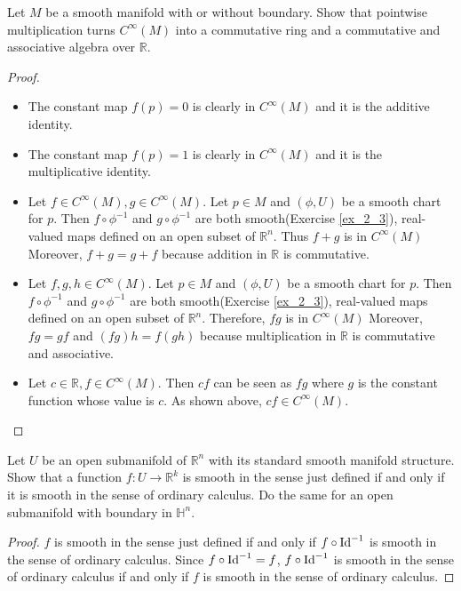 \begin{customexer}{2.1}
  Let $M$ be a smooth manifold with or without boundary.
  Show that pointwise multiplication turns $C^{\infty}(M)$ into a commutative ring and a commutative and associative algebra over $\mathbb{R}$.
\end{customexer}

\begin{proof}
  $ $
  \begin{itemize}
    \item
      The constant map $f(p) = 0$ is clearly in $C^{\infty}(M)$ and it is the additive identity.
    \item
      The constant map $f(p) = 1$ is clearly in $C^{\infty}(M)$ and it is the multiplicative identity.
    \item
      Let $f \in C^{\infty}(M), g \in C^{\infty}(M)$.
      Let $p \in M$ and $(\phi, U)$ be a smooth chart for $p$.
      Then $f \circ \phi^{-1}$ and $g \circ \phi^{-1}$ are both smooth(Exercise \ref{ex_2_3}), real-valued maps defined on an open subset of $\mathbb{R}^n$.
      Thus $f + g$ is in $C^{\infty}(M)$ 
      Moreover, $f + g = g + f$ because addition in $\mathbb{R}$ is commutative.
    \item
      Let $f, g, h \in C^{\infty}(M)$.
      Let $p \in M$ and $(\phi, U)$ be a smooth chart for $p$.
      Then $f \circ \phi^{-1}$ and $g \circ \phi^{-1}$ are both smooth(Exercise \ref{ex_2_3}), real-valued maps defined on an open subset of $\mathbb{R}^n$.
      Therefore, $fg$ is in $C^{\infty}(M)$
      Moreover, $fg = gf$ and $(fg)h = f(gh)$ because multiplication in $\mathbb{R}$ is commutative and associative.
    \item
      Let $c \in \mathbb{R}, f \in C^{\infty}(M)$.
      Then $cf$ can be seen as $fg$ where $g$ is the constant function whose value is $c$.
      As shown above, $cf \in C^{\infty}(M)$.
  \end{itemize}
\end{proof}

\begin{customexer}{2.2}
  Let $U$ be an open submanifold of $\mathbb{R}^n$ with its standard smooth manifold structure.
  Show that a function $f: U \rightarrow \mathbb{R}^k$ is smooth in the sense just defined if and only if it is smooth in the sense of ordinary calculus.
  Do the same for an open submanifold with boundary in $\mathbb{H}^n$.
\end{customexer}

\begin{proof}
  $f$ is smooth in the sense just defined if and only if $f \circ \operatorname{Id}^{-1}$ is smooth in the sense of ordinary calculus.
  Since $f \circ \operatorname{Id}^{-1} = f$, $f \circ \operatorname{Id}^{-1}$ is smooth in the sense of ordinary calculus if and only if $f$ is smooth in the sense of ordinary calculus.
\end{proof}


